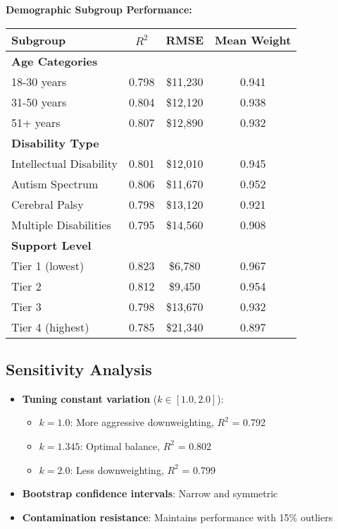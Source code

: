 \textbf{Demographic Subgroup Performance:}
\begin{center}
\begin{tabular}{lccc}
\toprule
Subgroup & $R^2$ & RMSE & Mean Weight \\
\midrule
\textbf{Age Categories} & & & \\
18-30 years & 0.798 & \$11,230 & 0.941 \\
31-50 years & 0.804 & \$12,120 & 0.938 \\
51+ years & 0.807 & \$12,890 & 0.932 \\
\midrule
\textbf{Disability Type} & & & \\
Intellectual Disability & 0.801 & \$12,010 & 0.945 \\
Autism Spectrum & 0.806 & \$11,670 & 0.952 \\
Cerebral Palsy & 0.798 & \$13,120 & 0.921 \\
Multiple Disabilities & 0.795 & \$14,560 & 0.908 \\
\midrule
\textbf{Support Level} & & & \\
Tier 1 (lowest) & 0.823 & \$6,780 & 0.967 \\
Tier 2 & 0.812 & \$9,450 & 0.954 \\
Tier 3 & 0.798 & \$13,670 & 0.932 \\
Tier 4 (highest) & 0.785 & \$21,340 & 0.897 \\
\bottomrule
\end{tabular}
\end{center}

\subsection{Sensitivity Analysis}

\begin{itemize}
    \item \textbf{Tuning constant variation} ($k \in [1.0, 2.0]$):
    \begin{itemize}
        \item $k = 1.0$: More aggressive downweighting, $R^2$ = 0.792
        \item $k = 1.345$: Optimal balance, $R^2$ = 0.802
        \item $k = 2.0$: Less downweighting, $R^2$ = 0.799
    \end{itemize}
    \item \textbf{Bootstrap confidence intervals}: Narrow and symmetric
    \item \textbf{Contamination resistance}: Maintains performance with 15\% outliers
\end{itemize}

